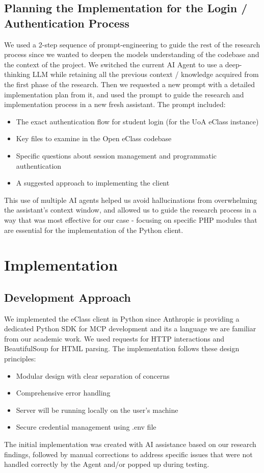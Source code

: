 \documentclass[11pt,a4paper]{article}
\begin{document}
\subsection{Planning the Implementation for the Login / Authentication Process}
We used a 2-step sequence of prompt-engineering to guide the rest of the research process since we wanted to deepen the models understanding of the codebase and the context of the project. We switched the current AI Agent to use a deep-thinking LLM while retaining all the previous context / knowledge acquired from the first phase of the research. Then we requested a new prompt with a detailed implementation plan from it, and used the prompt to guide the research and implementation process in a new fresh assistant. The prompt included:

\begin{itemize}
    \item The exact authentication flow for student login (for the UoA eClass instance)
    \item Key files to examine in the Open eClass codebase 
    \item Specific questions about session management and programmatic authentication
    \item A suggested approach to implementing the client
\end{itemize}
This use of multiple AI agents helped us avoid hallucinations from overwhelming the assistant's context window, and allowed us to guide the research process in a way that was most effective for our case - focusing on specific PHP modules that are essential for the implementation of the Python client.

\section{Implementation}
\subsection{Development Approach}
We implemented the eClass client in Python since Anthropic is providing a dedicated Python SDK for MCP development and its a language we are familiar from our academic work. We used requests for HTTP interactions and BeautifulSoup for HTML parsing. The implementation follows these design principles:

\begin{itemize}
    \item Modular design with clear separation of concerns
    \item Comprehensive error handling
    \item Server will be running locally on the user's machine
    \item Secure credential management using .env file
\end{itemize}
The initial implementation was created with AI assistance based on our research findings, followed by manual corrections to address specific issues that were not handled correctly by the Agent and/or popped up during testing.
\end{document}
